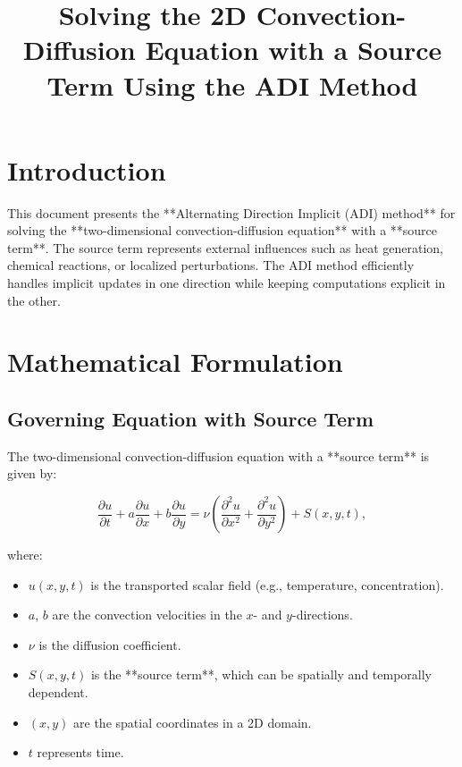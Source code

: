 \documentclass{article}
\begin{document}
\title{Solving the 2D Convection-Diffusion Equation with a Source Term Using the ADI Method}
\author{}
\date{}
\maketitle

\section{Introduction}
This document presents the **Alternating Direction Implicit (ADI) method** for solving the **two-dimensional convection-diffusion equation** with a **source term**. The source term represents external influences such as heat generation, chemical reactions, or localized perturbations. The ADI method efficiently handles implicit updates in one direction while keeping computations explicit in the other.

\section{Mathematical Formulation}

\subsection{Governing Equation with Source Term}
The two-dimensional convection-diffusion equation with a **source term** is given by:

\begin{equation}
    \frac{\partial u}{\partial t} + a \frac{\partial u}{\partial x} + b \frac{\partial u}{\partial y} = \nu \left( \frac{\partial^2 u}{\partial x^2} + \frac{\partial^2 u}{\partial y^2} \right) + S(x,y,t),
\end{equation}

where:
\begin{itemize}
    \item \( u(x, y, t) \) is the transported scalar field (e.g., temperature, concentration).
    \item \( a \), \( b \) are the convection velocities in the \( x \)- and \( y \)-directions.
    \item \( \nu \) is the diffusion coefficient.
    \item \( S(x,y,t) \) is the **source term**, which can be spatially and temporally dependent.
    \item \( (x,y) \) are the spatial coordinates in a 2D domain.
    \item \( t \) represents time.
\end{itemize}
\end{document}

